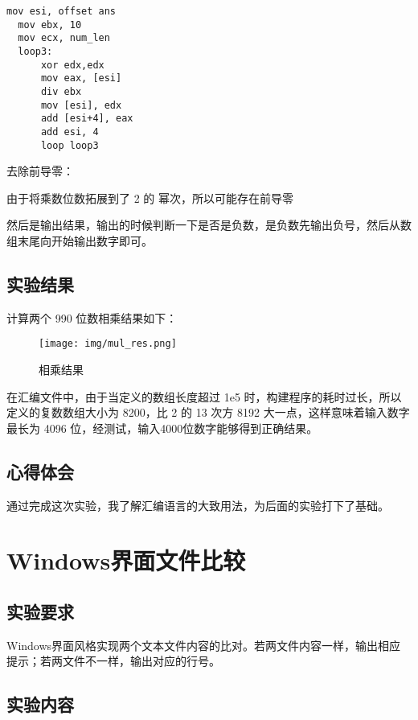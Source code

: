 \documentclass[proposal-report]{bitart}
\begin{document}
\begin{lstlisting}[language={[x86masm]Assembler}]
  mov esi, offset ans
  mov ebx, 10
  mov ecx, num_len
  loop3:
      xor edx,edx
      mov eax, [esi]
      div ebx
      mov [esi], edx
      add [esi+4], eax
      add esi, 4
      loop loop3
\end{lstlisting}

去除前导零：

由于将乘数位数拓展到了 2 的 幂次，所以可能存在前导零

然后是输出结果，输出的时候判断一下是否是负数，是负数先输出负号，然后从数组末尾向开始输出数字即可。

\subsection{实验结果}

计算两个 990 位数相乘结果如下：

\begin{figure}[H]
  \centering
  \texttt{[image: img/mul\_res.png]}
  \caption{相乘结果}
\end{figure}

在汇编文件中，由于当定义的数组长度超过 1e5 时，构建程序的耗时过长，所以定义的复数数组大小为 8200，比 2 的 13 次方 8192 大一点，这样意味着输入数字最长为 4096 位，经测试，输入4000位数字能够得到正确结果。

\subsection{心得体会}

通过完成这次实验，我了解汇编语言的大致用法，为后面的实验打下了基础。

\section{Windows界面文件比较}

\subsection{实验要求}

Windows界面风格实现两个文本文件内容的比对。若两文件内容一样，输出相应提示；若两文件不一样，输出对应的行号。

\subsection{实验内容}
\end{document}
